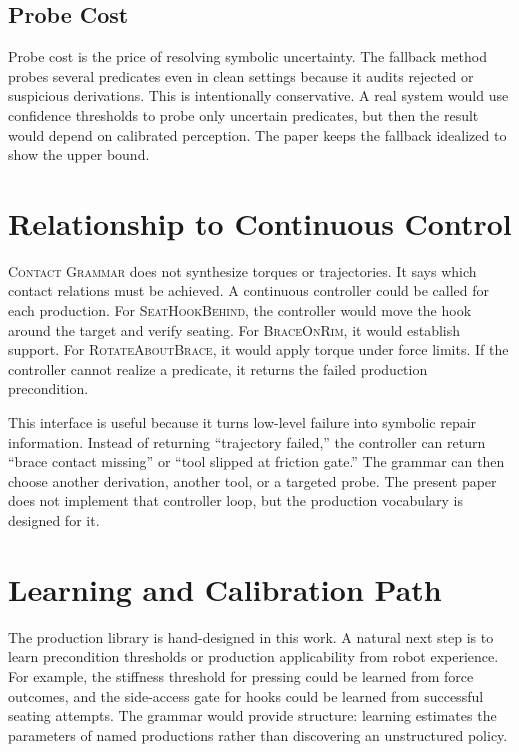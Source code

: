 \documentclass{article}
\newcommand{\CG}{\textsc{Contact Grammar}}
\begin{document}
\subsection{Probe Cost}

Probe cost is the price of resolving symbolic uncertainty. The fallback method probes several predicates even in clean settings because it audits rejected or suspicious derivations. This is intentionally conservative. A real system would use confidence thresholds to probe only uncertain predicates, but then the result would depend on calibrated perception. The paper keeps the fallback idealized to show the upper bound.

\section{Relationship to Continuous Control}

\CG{} does not synthesize torques or trajectories. It says which contact relations must be achieved. A continuous controller could be called for each production. For \textsc{SeatHookBehind}, the controller would move the hook around the target and verify seating. For \textsc{BraceOnRim}, it would establish support. For \textsc{RotateAboutBrace}, it would apply torque under force limits. If the controller cannot realize a predicate, it returns the failed production precondition.

This interface is useful because it turns low-level failure into symbolic repair information. Instead of returning ``trajectory failed,'' the controller can return ``brace contact missing'' or ``tool slipped at friction gate.'' The grammar can then choose another derivation, another tool, or a targeted probe. The present paper does not implement that controller loop, but the production vocabulary is designed for it.

\section{Learning and Calibration Path}

The production library is hand-designed in this work. A natural next step is to learn precondition thresholds or production applicability from robot experience. For example, the stiffness threshold for pressing could be learned from force outcomes, and the side-access gate for hooks could be learned from successful seating attempts. The grammar would provide structure: learning estimates the parameters of named productions rather than discovering an unstructured policy.
\end{document}
